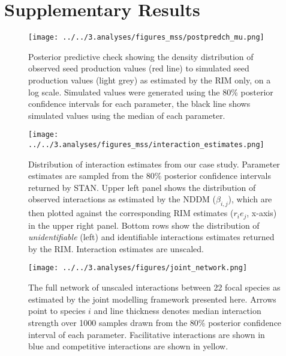 \section{Supplementary Results}
\label{SI:results}


    \begin{figure}[H]
        \texttt{[image: ../../3.analyses/figures\_mss/postpredch\_mu.png]}
        \caption{Posterior predictive check showing the density distribution of observed seed production values (red line) to simulated seed production values (light grey) as estimated by the RIM only, on a log scale. Simulated values were generated using the 80\% posterior confidence intervals for each parameter, the black line shows simulated values using the median of each parameter. }
        \label{fig:ppcheckmu1}
    \end{figure}

    \begin{figure}[H]
        \texttt{[image: ../../3.analyses/figures\_mss/interaction\_estimates.png]}
        \caption{Distribution of interaction estimates from our case study. Parameter estimates are sampled from the 80\% posterior confidence intervals returned by STAN. Upper left panel shows the distribution of observed interactions as estimated by the NDDM ($\beta_{i, j}$), which are then plotted against the corresponding RIM estimates ($r_{i} e_j$, x-axis) in the upper right panel. Bottom rows show the distribution of \textit{unidentifiable} (left) and identifiable interactions estimates returned by the RIM. Interaction estimates are unscaled.}
        \label{fig:adist}
    \end{figure}


    \begin{figure}[H]
        \texttt{[image: ../../3.analyses/figures/joint\_network.png]}
        \caption{The full network of unscaled interactions between 22 focal species as estimated by the joint modelling framework presented here. Arrows point to species $i$ and line thickness denotes median interaction strength over 1000 samples drawn from the 80\% posterior confidence interval of each parameter. Facilitative interactions are shown in blue and competitive interactions are shown in yellow.}
        \label{fig:jointnetwork}
    \end{figure}

